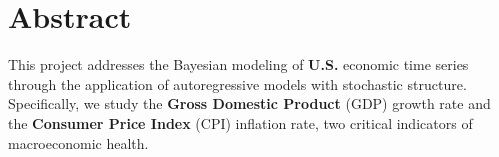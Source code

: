 \documentclass{Configuration_Files/PoliMi3i_thesis}
\begin{document}


\pagestyle{empty} %
\frontmatter %



\pagestyle{empty}
\frontmatter            
\tableofcontents        

\startpreamble
\setcounter{page}{1} %

\chapter*{Abstract} 
This project addresses the Bayesian modeling of \textbf{U.S.} economic time series through the application of autoregressive models with stochastic structure. Specifically, we study the \textbf{Gross Domestic Product} (GDP) growth rate and the \textbf{Consumer Price Index} (CPI) inflation rate, two critical indicators of macroeconomic health.
\end{document}
